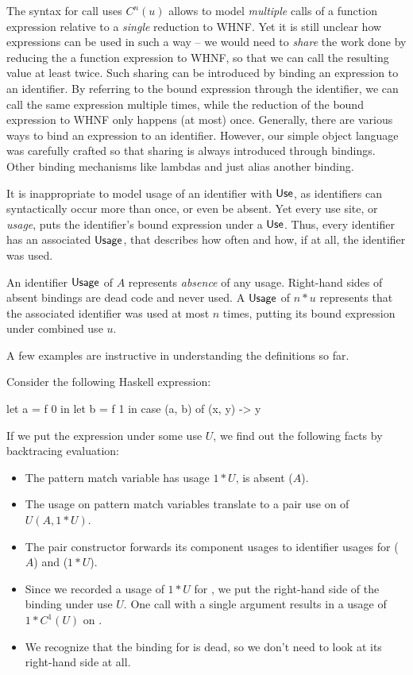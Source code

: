 The syntax for call uses $C^n(u)$ allows to model \emph{multiple} calls of a function expression relative to a \emph{single} reduction to WHNF. 
Yet it is still unclear how expressions can be used in such a way -- we would need to \emph{share} the work done by reducing the a function expression to WHNF, so that we can call the resulting value at least twice.
Such sharing can be introduced by binding an expression to an identifier. 
By referring to the bound expression through the identifier, we can call the same expression multiple times, while the reduction of the bound expression to WHNF only happens (at most) once. 
Generally, there are various ways to bind an expression to an identifier. 
However, our simple object language was carefully crafted so that sharing is always introduced through  bindings. 
Other binding mechanisms like lambdas and  just alias another binding. 

It is inappropriate to model usage of an identifier with $\text{\textsf{Use}}$, as identifiers can syntactically occur more than once, or even be absent. 
Yet every use site, or \emph{usage}, puts the identifier's bound expression under a $\text{\textsf{Use}}$. 
Thus, every identifier has an associated $\text{\textsf{Usage}}$, that describes how often and how, if at all, the identifier was used.

An identifier $\text{\textsf{Usage}}$ of $A$ represents \emph{absence} of any usage. 
Right-hand sides of absent bindings are dead code and never used.
A $\text{\textsf{Usage}}$ of $n*u$ represents that the associated identifier was used at most $n$ times, putting its bound expression under combined use $u$.

A few examples are instructive in understanding the definitions so far.

\begin{example} 
Consider the following Haskell expression:

\begin{haskellcode}
let a = f 0 
in let b = f 1 
   in case (a, b) of
        (x, y) -> y
\end{haskellcode}

If we put the expression under some use $U$, we find out the following facts by backtracing evaluation:

\begin{itemize}
\item The pattern match variable  has usage $1*U$,  is absent ($A$).
\item The usage on pattern match variables translate to a pair use on  of $U(A,1*U)$.
\item The pair constructor forwards its component usages to identifier usages for  ($A$) and  ($1*U$).
\item Since we recorded a usage of $1*U$ for , we put the right-hand side of the binding under use $U$. 
      One call with a single argument results in a usage of $1*C^1(U)$ on .
\item We recognize that the binding for  is dead, so we don't need to look at its right-hand side at all.
\end{itemize}
\end{example}

